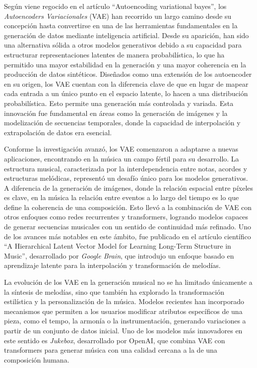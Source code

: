 Según viene regocido en el artículo ``Autoencoding variational bayes''\citep{kingma2013vae}, los \emph{Autoencoders Variacionales} (VAE) han recorrido un largo camino desde su concepción hasta convertirse en una de las herramientas fundamentales en la generación de datos mediante inteligencia artificial. Desde su aparición, han sido una alternativa sólida a otros modelos generativos debido a su capacidad para estructurar representaciones latentes de manera probabilística, lo que ha permitido una mayor estabilidad en la generación y una mayor coherencia en la producción de datos sintéticos. Diseñados como una extensión de los autoencoder en su origen, los VAE cuentan con la diferencia clave de que en lugar de mapear cada entrada a un único punto en el espacio latente, lo hacen a una distribución probabilística. Esto permite una generación más controlada y variada. Esta innovación fue fundamental en áreas como la generación de imágenes y la modelización de secuencias temporales, donde la capacidad de interpolación y extrapolación de datos era esencial.

Conforme la investigación avanzó, los VAE comenzaron a adaptarse a nuevas aplicaciones, encontrando en la música un campo fértil para su desarrollo. La estructura musical, caracterizada por la interdependencia entre notas, acordes y estructuras melódicas, representó un desafío único para los modelos generativos. A diferencia de la generación de imágenes, donde la relación espacial entre píxeles es clave, en la música la relación entre eventos a lo largo del tiempo es lo que define la coherencia de una composición. Esto llevó a la combinación de VAE con otros enfoques como redes recurrentes y transformers, logrando modelos capaces de generar secuencias musicales con un sentido de continuidad más refinado. Uno de los avances más notables en este ámbito, fue publicado en el artículo científico ``A Hierarchical Latent Vector Model for Learning Long-Term Structure in Music''\citep{roberts2018musicvae}, desarrollado por \emph{Google Brain}, que introdujo un enfoque basado en aprendizaje latente para la interpolación y transformación de melodías.

La evolución de los VAE en la generación musical no se ha limitado únicamente a la síntesis de melodías, sino que también ha explorado la transformación estilística y la personalización de la música. Modelos recientes han incorporado mecanismos que permiten a los usuarios modificar atributos específicos de una pieza, como el tempo, la armonía o la instrumentación, generando variaciones a partir de un conjunto de datos inicial. Uno de los modelos más innovadores en este sentido es \emph{Jukebox}, desarrollado por OpenAI, que combina VAE con transformers para generar música con una calidad cercana a la de una composición humana.

